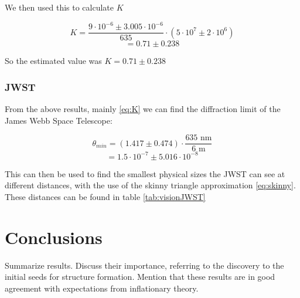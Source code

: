 \documentclass{emulateapj}
\begin{document}
We then used this to calculate $K$

\begin{equation}
K = \frac{9\cdot 10^{-6} \pm 3.005\cdot 10^{-6}}{635}\cdot(5\cdot10^7 \pm 2\cdot10^6)
\end{equation}
\begin{equation}
= 0.71 \pm 0.238
\end{equation}\label{eq:K}

So the estimated value was $K = 0.71 \pm 0.238$

\subsubsection{JWST}
From the above results, mainly \eqref{eq:K} we can find the diffraction limit of the James Webb Space Telescope:

\begin{equation}
\theta_{min} = (1.417 \pm 0.474) \cdot \frac{635 \text{ nm}}{6 \text{ m}}
\end{equation}
\begin{equation}
= 1.5\cdot 10^{-7} \pm 5.016\cdot 10^{-8}
\end{equation}\label{JWSTDiffLimit}

This can then be used to find the smallest physical sizes the JWST can see at different distances, with the use of the skinny triangle approximation \eqref{eq:skinny}. These distances can be found in table \eqref{tab:visionJWST}
\section{Conclusions}
\label{sec:conclusions}

Summarize results. Discuss their importance, referring to the
discovery to the initial seeds for structure formation. Mention that
these results are in good agreement with expectations from
inflationary theory.



%
%


%
\end{document}
